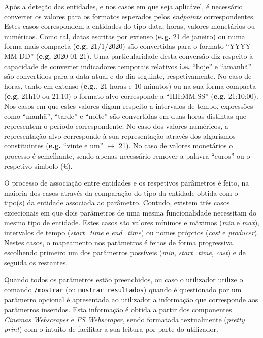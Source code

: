 \documentclass[11pt,a4paper]{article}
\begin{document}
Após a deteção das entidades, e nos casos em que seja aplicável, é necessário converter os valores para os
formatos esperados pelos \textit{endpoints} correspondentes. Estes casos correspondem a entidades do tipo
data, horas, valores monetários ou numéricos. Como tal, datas escritas por extenso (\textbf{e.g.} 21 de
janeiro) ou numa forma mais compacta (\textbf{e.g.} 21/1/2020) são convertidas para o formato ``YYYY-MM-DD''
(\textbf{e.g.} 2020-01-21). Uma particularidade desta conversão diz respeito à capacidade de converter
indicadores temporais relativos \textbf{i.e.}  ``hoje'' e ``amanhã'' são convertidos para a data atual e do
dia seguinte, respetivamente. No caso de horas, tanto em extenso (\textbf{e.g.}. 21 horas e 10 minutos) ou
na sua forma compacta (\textbf{e.g.} 21h10 ou 21:10) o formato alvo corresponde a ``HH:MM:SS''
(\textbf{e.g.} 21:10:00). Nos casos em que estes valores digam respeito a intervalos de tempo, expressões
como ``manhã'', ``tarde'' e ``noite'' são convertidas em duas horas distintas que representem o período
correspondente. No caso dos valores numéricos, a representação alvo corresponde à sua representação através
dos algarismos constituintes (\textbf{e.g.} ``vinte e um'' $\mapsto$ 21). No caso de valores monetários o
processo é semelhante, sendo apenas necessário remover a palavra ``euros'' ou o respetivo símbolo
(\euro{}).

O processo de associação entre entidades e os respetivos parâmetros é feito, na maioria dos casos através da
comparação do tipo da entidade obtida com o tipo(s) da entidade associada ao parâmetro. Contudo, existem três
casos excecionais em que dois parâmetros de uma mesma funcionalidade necessitam do mesmo tipo de
entidade. Estes casos são valores mínimos e máximos (\textit{min} e \textit{max}), intervalos de tempo
(\textit{start\_time} e \textit{end\_time}) ou nomes próprios (\textit{cast} e \textit{producer}). Nestes
casos, o mapeamento nos parâmetros é feitos de forma progressiva, escolhendo primeiro um dos parâmetros
possíveis (\textit{min}, \textit{start\_time}, \textit{cast}) e de seguida os restantes.

Quando todos os parâmetros estão preenchidos, ou caso o utilizador utilize o comando \texttt{/mostrar} (ou
\texttt{mostrar resultados}) quando é questionado por um parâmetro opcional é apresentada ao utilizador a
informação que corresponde aos parâmetros inseridos. Esta informação é obtida a partir dos componentes
\textit{Cinemas Webscraper} e \textit{FS Webscraper}, sendo formatada textualmente (\textit{pretty print}) com o intuito de
facilitar a sua leitura por parte do utilizador.
\end{document}

